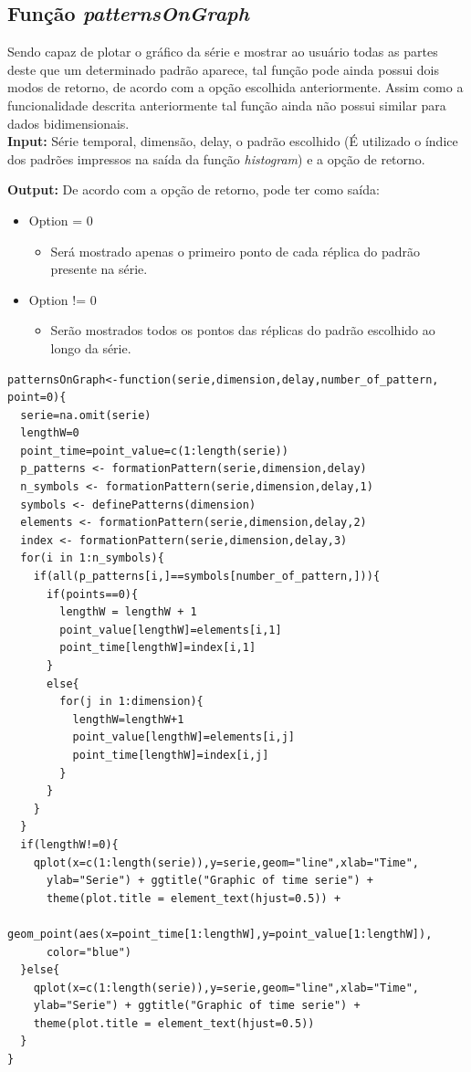 \documentclass[12pt,letterpaper]{article}
\begin{document}
\subsection{Função \textit{patternsOnGraph}}

Sendo capaz de plotar o gráfico da série e mostrar ao usuário todas as partes deste que um determinado padrão aparece, tal função pode ainda possui dois modos de retorno, de acordo com a opção escolhida anteriormente. Assim como a funcionalidade descrita anteriormente tal função ainda não possui similar para dados bidimensionais.\\

\textbf{Input: } Série temporal, dimensão, delay, o padrão escolhido (É utilizado o índice dos padrões impressos na saída da função \textit{histogram}) e a opção de retorno.

\textbf{Output: } De acordo com a opção de retorno, pode ter como saída:

\begin{itemize}
\item Option = 0
	\begin{itemize}
	\item Será mostrado apenas o primeiro ponto de cada réplica do padrão presente na série.
	\end{itemize}
\item Option != 0
	\begin{itemize}
	\item Serão mostrados todos os pontos das réplicas do padrão escolhido ao longo da série.
	\end{itemize}
\end{itemize}

\begin{lstlisting}
patternsOnGraph<-function(serie,dimension,delay,number_of_pattern,
point=0){
  serie=na.omit(serie)
  lengthW=0
  point_time=point_value=c(1:length(serie))
  p_patterns <- formationPattern(serie,dimension,delay)
  n_symbols <- formationPattern(serie,dimension,delay,1)
  symbols <- definePatterns(dimension)
  elements <- formationPattern(serie,dimension,delay,2)
  index <- formationPattern(serie,dimension,delay,3)
  for(i in 1:n_symbols){
    if(all(p_patterns[i,]==symbols[number_of_pattern,])){
      if(points==0){
        lengthW = lengthW + 1
        point_value[lengthW]=elements[i,1]
        point_time[lengthW]=index[i,1]
      }
      else{
        for(j in 1:dimension){
          lengthW=lengthW+1
          point_value[lengthW]=elements[i,j]
          point_time[lengthW]=index[i,j]
        }
      }
    }
  }
  if(lengthW!=0){
    qplot(x=c(1:length(serie)),y=serie,geom="line",xlab="Time",
   	  ylab="Serie") + ggtitle("Graphic of time serie") +
      theme(plot.title = element_text(hjust=0.5)) +
      geom_point(aes(x=point_time[1:lengthW],y=point_value[1:lengthW]),
      color="blue")
  }else{
    qplot(x=c(1:length(serie)),y=serie,geom="line",xlab="Time",
    ylab="Serie") + ggtitle("Graphic of time serie") +
    theme(plot.title = element_text(hjust=0.5))
  }
}
\end{lstlisting}
\end{document}
